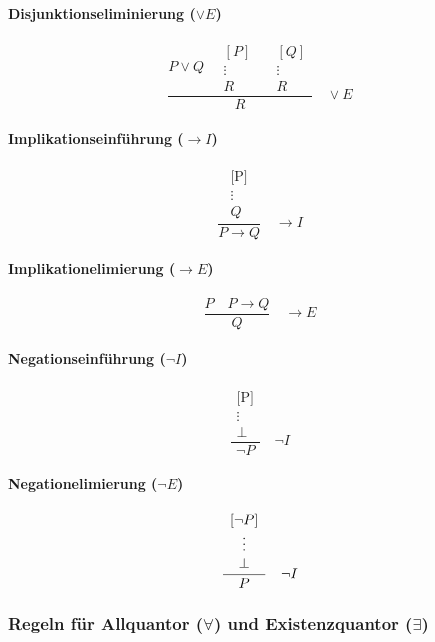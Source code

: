 \documentclass[main.tex]{subfiles}
\begin{document}
\paragraph{Disjunktionseliminierung ($\lor E$)}
\[
\frac{
P \lor Q 
\quad
\begin{array}{c}
[P]\\
\vdots\\
R
\end{array}
\quad
\begin{array}{c}
[Q]\\
\vdots\\
R
\end{array}
}{R}
\quad \lor E
\]

\paragraph{Implikationseinführung ($\to I$)}
\[
\frac{
\begin{array}{c}
\text{[P]} \\
\vdots \\
Q
\end{array}
}{P \rightarrow Q}
\quad \to I
\]


\paragraph{Implikationelimierung ($\to E$)}
\[
\frac{P \quad P \to Q}{Q}
\quad \to E
\]

\paragraph{Negationseinführung ($\neg I$)}
\[
\frac{
\begin{array}{c}
\text{[P]} \\
\vdots \\
\bot
\end{array}
}{\neg P}
\quad \neg I
\]

\paragraph{Negationelimierung ($\neg E$)}
\[
\frac{
\begin{array}{c}
\text{[\ensuremath{\neg P}]} \\
\vdots \\
\bot
\end{array}
}{P}
\quad \neg I
\]

\subsubsection{Regeln für Allquantor ($\forall$) und Existenzquantor ($\exists$)}
\end{document}
